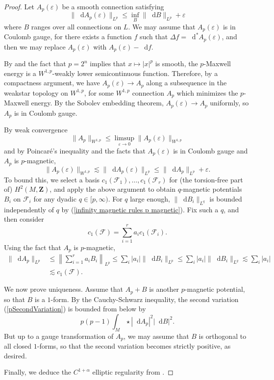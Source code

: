 \documentclass[reqno,11pt]{amsart}
\newcommand{\ZZ}{\mathbf{Z}}
\newcommand*\dif{\mathop{}\!\mathrm{d}}
\theoremstyle{definition}
\numberwithin{equation}{section}
\begin{document}
\begin{proof}
Let $A_p(\varepsilon)$ be a smooth connection satisfying
$$\|\dif A_p(\varepsilon)\|_{L^p} \leq \inf_B \|\dif B\|_{L^p} + \varepsilon$$
where $B$ ranges over all connections on $L$. 
We may assume that $A_p(\varepsilon)$ is in Coulomb gauge, for there exists a function $f$ such that $\Delta f = \dif^* A_p(\varepsilon)$, and then we may replace $A_p(\varepsilon)$ with $A_p(\varepsilon) - \dif f$.

By \cite[\S8.2.2]{evans2010partial} and the fact that $p = 2^n$ implies that $x \mapsto |x|^p$ is smooth, the $p$-Maxwell energy is a $W^{1, p}$-weakly lower semicontinuous function.
Therefore, by a compactness argument, we have $A_p(\varepsilon) \to A_p$ along a subsequence in the weakstar topology on $W^{1, p}$, for some $W^{1, p}$ connection $A_p$ which minimizes the $p$-Maxwell energy.
By the Sobolev embedding theorem, $A_p(\varepsilon) \to A_p$ uniformly, so $A_p$ is in Coulomb gauge.

By weak convergence
$$\|A_p\|_{W^{1, p}} \leq \limsup_{\varepsilon \to 0} \|A_p(\varepsilon)\|_{W^{1, p}}$$
and by Poincar\'e's inequality and the facts that $A_p(\varepsilon)$ is in Coulomb gauge and $A_p$ is $p$-magnetic,
$$\|A_p(\varepsilon)\|_{W^{1, p}} \lesssim \|\dif A_p(\varepsilon)\|_{L^p} \leq \|\dif A_p\|_{L^p} + \varepsilon.$$
To bound this, we select a basis $c_1(\mathscr F_1), \dots, c_1(\mathscr F_r)$ for (the torsion-free part of) $H^2(M, \ZZ)$, and apply the above argument to obtain $q$-magnetic potentials $B_i$ on $\mathscr F_i$ for any dyadic $q \in [p, \infty)$.
For $q$ large enough, $\|\dif B_i\|_{L^q}$ is bounded independently of $q$ by (\ref{infinity magnetic rules p magnetic}).
Fix such a $q$, and then consider
$$c_1(\mathscr F) = \sum_{i=1}^r a_i c_1(\mathscr F_i).$$
Using the fact that $A_p$ is $p$-magnetic,
\begin{align*}
\|\dif A_p\|_{L^p}
&\leq \left\|\sum_{i=1}^r a_i B_i\right\|_{L^p} \leq \sum_i |a_i| \|\dif B_i\|_{L^p} \leq \sum_i |a_i| \|\dif B_i\|_{L^q} \lesssim \sum_i |a_i| \\
&\lesssim c_1(\mathscr F).
\end{align*}

We now prove uniqueness.
Assume that $A_p + B$ is another $p$-magnetic potential, so that $B$ is a $1$-form.
By the Cauchy-Schwarz inequality, the second variation (\ref{pSecondVariation}) is bounded from below by 
$$p (p - 1) \int_M \star |\dif A_p|^2 |\dif B|^2.$$
But up to a gauge transformation of $A_p$, we may assume that $B$ is orthogonal to all closed $1$-forms, so that the second variation becomes strictly positive, as desired.

Finally, we deduce the $C^{1 + \alpha}$ elliptic regularity from \cite{Uhlenbeck77}.
\end{proof}
\end{document}
